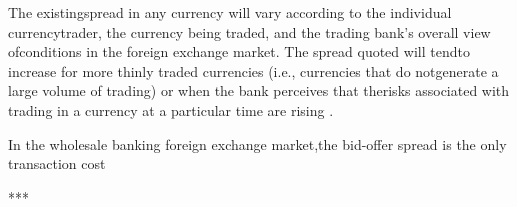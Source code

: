 The existingspread in any currency will vary according to the individual currencytrader, the currency being traded, and the trading bank’s overall view ofconditions in the foreign exchange market. The spread quoted will tendto increase for more thinly traded currencies (i.e., currencies that do notgenerate a large volume of trading) or when the bank perceives that therisks associated with trading in a currency at a particular time are rising \cite{book_forex_2}.

In the wholesale banking foreign exchange market,the bid-offer spread is the only transaction cost \cite{book_forex_2}

***